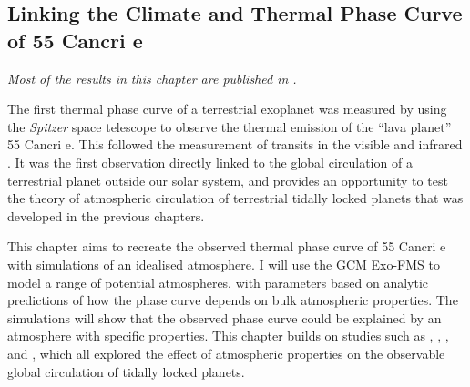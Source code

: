 \begin{SingleSpace}
\chapter{Linking the Climate and Thermal Phase Curve of 55 Cancri e}\label{ch:linking-climate-55cnce}
\end{SingleSpace}

\noindent
 \vspace*{-0.5cm}
\textit{Most of the results in this chapter are published in \citet{hammond2017climate}.}
 \vspace*{0.5cm}







The first thermal phase curve of a terrestrial exoplanet was measured by \citet{demory201655cnce} using the \textit{Spitzer} space telescope to observe the thermal emission of the ``lava planet'' 55 Cancri e. This followed the measurement of transits in the visible \citep{winn2011super} and infrared
\citep{demory201155cnce}. It was the first observation directly linked to the global circulation of a terrestrial planet outside our solar system, and provides an opportunity to test the theory of atmospheric circulation of terrestrial tidally locked planets that was developed in the previous chapters.

This chapter aims to recreate the observed thermal phase curve of 55 Cancri e with simulations of an idealised atmosphere. I will use the GCM Exo-FMS to model a range of potential atmospheres, with parameters based on analytic predictions of how the phase curve depends on bulk atmospheric properties. The simulations will show that the observed phase curve could be explained by an atmosphere with specific properties. This chapter builds on studies such as \citet{cowan2011statistics}, \citet{menou2012magnetic}, \citet{komacek2016daynightI}, and \citet{zhang2017dynamics}, which all explored the effect of atmospheric properties on the observable global circulation of tidally locked planets.

